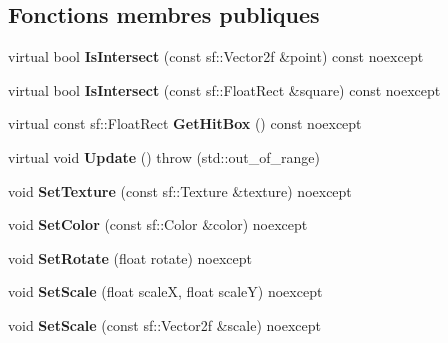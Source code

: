 \subsection*{Fonctions membres publiques}
\begin{DoxyCompactItemize}
\item 
\mbox{\label{classmy_1_1SpriteObject_a02631a9375ca3b75fb8e57c2fb678b0c}} 
virtual bool {\bfseries Is\+Intersect} (const sf\+::\+Vector2f \&point) const noexcept
\item 
\mbox{\label{classmy_1_1SpriteObject_a1700db880801ebcbb32cf48a0bf011b6}} 
virtual bool {\bfseries Is\+Intersect} (const sf\+::\+Float\+Rect \&square) const noexcept
\item 
\mbox{\label{classmy_1_1SpriteObject_aa41083f207f9ef3e3bcfef14a959c492}} 
virtual const sf\+::\+Float\+Rect {\bfseries Get\+Hit\+Box} () const noexcept
\item 
\mbox{\label{classmy_1_1SpriteObject_a49398fd0213bbbd95f7beb9496df2ecf}} 
virtual void {\bfseries Update} ()  throw (std\+::out\+\_\+of\+\_\+range)
\item 
\mbox{\label{classmy_1_1SpriteObject_a8f23dad9d0a73b6e48c411c555fee70c}} 
void {\bfseries Set\+Texture} (const sf\+::\+Texture \&texture) noexcept
\item 
\mbox{\label{classmy_1_1SpriteObject_aaee4594452b0b9e08b65348185aa1855}} 
void {\bfseries Set\+Color} (const sf\+::\+Color \&color) noexcept
\item 
\mbox{\label{classmy_1_1SpriteObject_addfa5e1323015cf8829e922b8a550e9c}} 
void {\bfseries Set\+Rotate} (float rotate) noexcept
\item 
\mbox{\label{classmy_1_1SpriteObject_aaaac0961989244f2826c683d95e9caec}} 
void {\bfseries Set\+Scale} (float scaleX, float scaleY) noexcept
\item 
\mbox{\label{classmy_1_1SpriteObject_ac7b290f44c1430d972ba0045bd888aaf}} 
void {\bfseries Set\+Scale} (const sf\+::\+Vector2f \&scale) noexcept

\end{DoxyCompactItemize}
